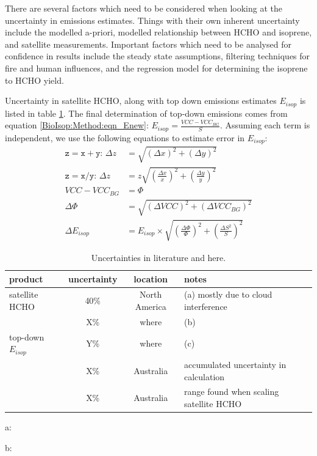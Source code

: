   There are several factors which need to be considered when looking at the uncertainty in emissions estimates.
  Things with their own inherent uncertainty include the modelled a-priori, modelled relationship between HCHO and isoprene, and satellite measurements.
  Important factors which need to be analysed for confidence in results include the steady state assumptions, filtering techniques for fire and human influences, and the regression model for determining the isoprene to HCHO yield.
  
  Uncertainty in satellite HCHO, along with top down emissions estimates $E_{isop}$ is listed in table \ref{Model:Uncertainty:tab_uncertainties}.
  The final determination of top-down emissions comes from equation \ref{BioIsop:Method:eqn_Enew}: $E_{isop}=\frac{VCC - VCC_{BG}}{S}$.
  Assuming each term is independent, we use the following equations to estimate error in $E_{isop}$:
  \begin{align*}
    \mathtt{z=x+y:} \, \Delta{z} & = \sqrt{(\Delta{x})^2 + (\Delta{y})^2} \\
    \mathtt{z=x/y:} \, \Delta{z} & = z \sqrt{(\frac{\Delta{x}}{x})^2 + (\frac{\Delta{y}}{y})^2} \\
    VCC - VCC_{BG} & = \Phi \\
    \Delta{\Phi} & = \sqrt{(\Delta{VCC})^2 + (\Delta{VCC_{BG}})^2} \\
    \Delta{E_{isop}} &= E_{isop} \times \sqrt{(\frac{\Delta{\Phi}}{\Phi})^2 + (\frac{\Delta{S}^2}{S})^2}
  \end{align*}
  \begin{table}\begin{threeparttable}
    \caption{Uncertainties in literature and here.}
    \begin{tabular}{ l | c  c  l } 
      \toprule
      product & uncertainty & location & notes \\
      \midrule
      satellite HCHO & 40\% & North America & (a) mostly due to cloud interference \\
       & X\% & where & (b) \\
      top-down $E_{isop}$ & Y\% & where & (c) \\
       & X\% & Australia & accumulated uncertainty in calculation \\
       & X\% & Australia & range found when scaling satellite HCHO \\
      \bottomrule
    \end{tabular}
    \begin{tablenotes} 
      \item a: \textcite{Millet2006,Palmer2006}
      \item b: 
    \end{tablenotes}
    \label{Model:Uncertainty:tab_uncertainties}
  \end{threeparttable}\end{table}
  
